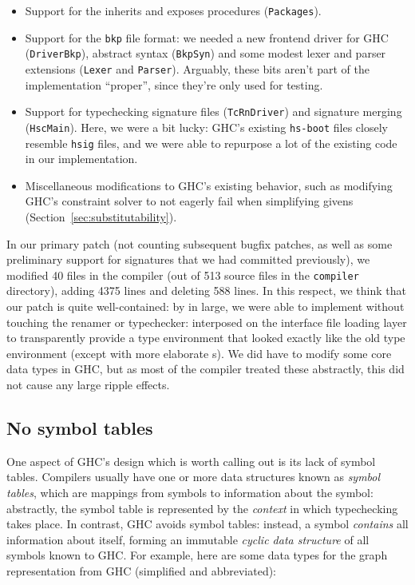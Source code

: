 \begin{itemize}
    \item Support for the \textsf{inherits} and \textsf{exposes} procedures
    (\verb|Packages|).

    \item Support for the \verb|bkp| file format: we needed
    a new frontend driver for GHC (\verb|DriverBkp|), abstract syntax (\verb|BkpSyn|)
    and some modest lexer and parser extensions (\verb|Lexer| and \verb|Parser|).
    Arguably, these bits aren't part of the implementation ``proper'', since
    they're only used for testing.

    \item Support for typechecking signature files (\verb|TcRnDriver|)
    and signature merging (\verb|HscMain|).  Here, we were a bit lucky:
    GHC's existing \verb|hs-boot| files closely resemble \verb|hsig|
    files, and we were able to repurpose a lot of the existing code in
    our implementation.

    \item Miscellaneous modifications to GHC's existing behavior,
    such as modifying GHC's constraint solver to not eagerly fail when
    simplifying givens (Section~\ref{sec:substitutability}).
\end{itemize}
%
In our primary \Backpack{} patch (not counting subsequent bugfix
patches, as well as some preliminary support for signatures that we had
committed previously), we modified 40 files in the compiler (out of 513
source files in the \verb|compiler| directory), adding 4375 lines and
deleting 588 lines.  In this respect, we think that our \Backpack{}
patch is quite well-contained: by in large, we were able to implement
\Backpack{} without touching the renamer or typechecker: \Backpack{}
interposed on the interface file loading layer to transparently
provide a type environment that looked exactly like the old type
environment (except with more elaborate \uid{}s).  We did have to
modify some core data types in GHC, but as most of the compiler
treated these abstractly, this did not cause any large ripple effects.

\subsection{No symbol tables}
\label{sec:no-symbol-tables}

One aspect of GHC's design which is worth calling out is its lack
of symbol tables.
Compilers usually have one or more data structures known as
\emph{symbol tables}, which are mappings from symbols to information
about the symbol: abstractly, the symbol table is represented by
the \emph{context} in which typechecking takes place.
In contrast, GHC avoids symbol tables:  instead, a
symbol \emph{contains} all information about itself, forming an
immutable \emph{cyclic data structure} of all symbols
known to GHC\@.  For example, here are
some data types for the graph representation from GHC (simplified
and abbreviated):

